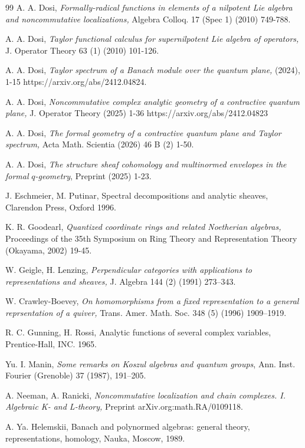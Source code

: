 \documentclass[12pt,reqno]{amsart}%
\theoremstyle{plain}
\numberwithin{theorem}{section} \numberwithin{equation}{section}
\numberwithin{lemma}{section}
\numberwithin{remark}{section}
\numberwithin{example}{section}
\numberwithin{proposition}{section}
\numberwithin{definition}{section}
\numberwithin{corollary}{section}
\begin{document}
\begin{thebibliography}{99}
A. A. Dosi, \textit{Formally-radical functions in elements of
a nilpotent Lie algebra and noncommutative localizations, }Algebra Colloq. 17
(Spec 1) (2010) 749-788.

A. A. Dosi, \textit{Taylor functional calculus for
supernilpotent Lie algebra of operators,} J. Operator Theory 63 (1) (2010) 101-126.

A. A. Dosi, \textit{Taylor spectrum of a Banach module over
the quantum plane,} (2024), 1-15 https://arxiv.org/abs/2412.04824.

A. A. Dosi, \textit{Noncommutative complex analytic geometry
of a contractive quantum plane, }J. Operator Theory (2025) 1-36 https://arxiv.org/abs/2412.04823

A. A. Dosi, \textit{The formal geometry of a contractive
quantum plane and Taylor spectrum, }Acta Math. Scientia (2026) 46 B (2) 1-50.

A. A. Dosi, \textit{The structure sheaf cohomology and
multinormed envelopes in the formal }$q$\textit{-geometry}, Preprint (2025) 1-23.

J. Eschmeier, M. Putinar, Spectral decompositions and analytic
sheaves, Clarendon Press, Oxford 1996.

K. R. Goodearl, \textit{Quantized coordinate rings and related
Noetherian algebras,} Proceedings of the 35th Symposium on Ring Theory and
Representation Theory (Okayama, 2002) 19-45.

W. Geigle, H. Lenzing, \textit{Perpendicular categories with
applications to representations and sheaves, }J. Algebra 144 (2) (1991) 273--343.

W. Crawley-Boevey, \textit{On homomorphisms from a fixed
representation to a general reprsentation of a quiver,} Trans. Amer. Math.
Soc. 348 (5) (1996) 1909--1919.

R. C. Gunning, H. Rossi, Analytic functions of several complex
variables, Prentice-Hall, INC. 1965.

Yu. I. Manin, \textit{Some remarks on Koszul algebras and quantum
groups}, Ann. Inst. Fourier (Grenoble) 37 (1987), 191--205.

A. Neeman, A. Ranicki, \textit{Noncommutative localization and
chain complexes. I. Algebraic K- and L-theory,} Preprint arXiv.org:math.RA/0109118.

A. Ya. Helemskii, Banach and polynormed algebras: general
theory, representations, homology, Nauka, Moscow, 1989.


\end{thebibliography}
\end{document}
